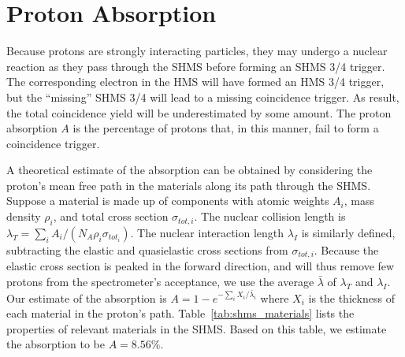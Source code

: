 \section{Proton Absorption}

Because protons are strongly interacting particles, they may undergo a nuclear
reaction as they pass through the SHMS before forming an SHMS 3/4 trigger.
The corresponding electron in the HMS will have formed an HMS 3/4 trigger, but
the ``missing'' SHMS 3/4 will lead to a missing coincidence trigger.
As result, the total coincidence yield will be underestimated by some amount.
The proton absorption $A$ is the percentage of protons that, in this manner,
fail to form a coincidence trigger.


A theoretical estimate of the absorption can be obtained by considering the
proton's mean free path in the materials along its path through the SHMS.
Suppose a material is made up of components with atomic weights $A_i$, mass
density $\rho_i$, and total cross section $\sigma_{tot,i}$.
The nuclear collision length is
$\lambda_{T} = \sum_i A_i / (N_A \rho_i \sigma_{tot_i})$.
The nuclear interaction length $\lambda_{I}$ is similarly defined, subtracting
the elastic and quasielastic cross sections from $\sigma_{tot,i}$.
Because the elastic cross section is peaked in the forward direction, and will
thus remove few protons from the spectrometer's acceptance, we use the average
$\bar\lambda$ of $\lambda_T$ and $\lambda_I$.
Our estimate of the absorption is $A=1-e^{-\sum_i X_i/\bar\lambda_i}$ where
$X_i$ is the thickness of each material in the proton's path.
Table~\ref{tab:shms_materials} lists the properties of relevant materials in
the SHMS.
Based on this table, we estimate the absorption to be $A=8.56\%$.


